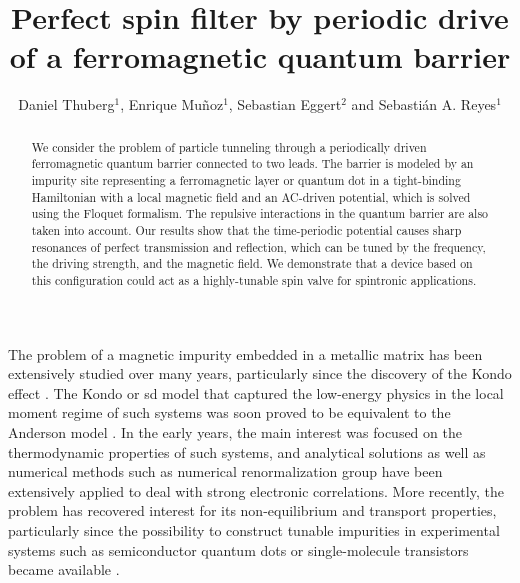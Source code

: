 \documentclass[aps,twocolumn,showpacs,floatfix,prl]{revtex4}
\begin{document}
\title{Perfect spin filter by periodic drive of a ferromagnetic quantum barrier}

\author{Daniel Thuberg$^1$, Enrique Mu\~noz$^1$, Sebastian Eggert$^2$ and Sebasti\'an A. Reyes$^1$}



\begin{abstract}
{ We consider the problem of particle tunneling through a periodically driven ferromagnetic 
quantum barrier connected to two leads.   The barrier is modeled
 by an impurity site representing a 
ferromagnetic layer or
quantum dot in
a tight-binding Hamiltonian with
a local magnetic field and an AC-driven potential, which is solved using the 
Floquet formalism.  The repulsive interactions in the quantum barrier are also taken into account.
Our results show that the time-periodic potential causes sharp resonances of perfect transmission
and reflection, which can be tuned by the frequency, the driving strength, and the 
magnetic field. 
We demonstrate that a device based on this configuration could act as a 
highly-tunable spin valve
for spintronic applications.}  
\end{abstract}



\maketitle


The problem of a magnetic impurity embedded in a metallic matrix has been extensively studied over many years, particularly since the discovery of the Kondo effect \cite{Kondo_64}. The Kondo
or sd model that captured the low-energy physics in the local moment regime of such systems
was soon proved to be equivalent to the Anderson model \cite{Anderson_61}. In the early years, the main interest was focused on the thermodynamic properties of such systems, and analytical solutions  \cite{Yosida.70,Yamada.75,Yamada.76,Yamada.79,Zlatic.83} as well as numerical methods such as numerical renormalization group \cite{Costi.94c,Costi.10} have been extensively applied to deal with strong electronic correlations. More recently, the problem has recovered
interest for its non-equilibrium and transport properties\cite{Beenakker.91,iftikhar2015two}, particularly since the possibility to construct 
{ tunable impurities in }
experimental systems such as semiconductor quantum dots or single-molecule transistors became available  \cite{GoldhaberGordon.98,Scott.09,Scott.13,perrin2015single}. 
\end{document}
